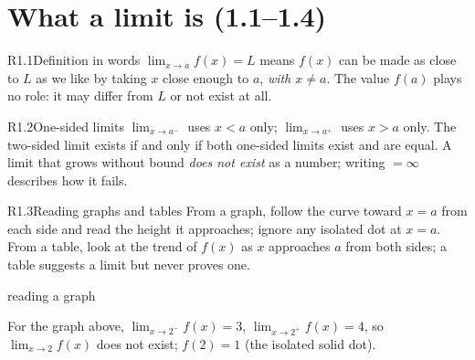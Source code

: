 \documentclass{apcalc}
\begin{document}
\section{What a limit is (1.1--1.4)}

\begin{rulebox}{R1.1}{Definition in words}
$\lim_{x\to a} f(x)=L$ means $f(x)$ can be made as close to $L$ as we like by taking $x$ close enough to $a$, \emph{with $x\neq a$}. The value $f(a)$ plays no role: it may differ from $L$ or not exist at all.
\end{rulebox}

\begin{rulebox}{R1.2}{One-sided limits}
$\lim_{x\to a^-}$ uses $x<a$ only; $\lim_{x\to a^+}$ uses $x>a$ only. The two-sided limit exists if and only if both one-sided limits exist and are equal. A limit that grows without bound \emph{does not exist} as a number; writing $=\infty$ describes how it fails.
\end{rulebox}

\begin{rulebox}{R1.3}{Reading graphs and tables}
From a graph, follow the curve toward $x=a$ from each side and read the height it approaches; ignore any isolated dot at $x=a$. From a table, look at the trend of $f(x)$ as $x$ approaches $a$ from both sides; a table suggests a limit but never proves one.
\end{rulebox}

\begin{example}{reading a graph}
\begin{center}
\end{center}
For the graph above, $\lim_{x\to2^-}f(x)=3$, $\lim_{x\to2^+}f(x)=4$, so $\lim_{x\to2}f(x)$ does not exist; $f(2)=1$ (the isolated solid dot). 
\end{example}
\end{document}
